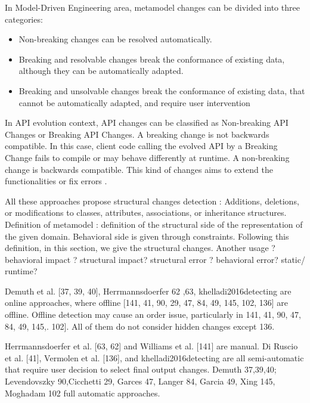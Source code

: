  In Model-Driven Engineering area, metamodel changes can be divided into three categories\cite{gruschko2007towards}:
 \begin{itemize}
 	
 \item	Non-breaking changes can be resolved automatically.
  \item Breaking and resolvable changes break the conformance of existing data, although they can be automatically adapted.
 \item Breaking and unsolvable changes break the conformance of existing data, that cannot be automatically adapted, and require user intervention
 \end{itemize}
 	In API evolution context, API changes can be classified as Non-breaking API Changes	or Breaking API Changes. A breaking change is not backwards compatible. In this case, client code calling the evolved API by a Breaking Change fails to compile or may behave differently at runtime. A non-breaking change is backwards compatible. This kind of changes aims to extend the functionalities or fix errors \cite{dig2006apis}.
 	
 	
 	


All these approaches propose structural changes detection : Additions, deletions, or modifications to classes, attributes, associations, or inheritance structures.
Definition of metamodel : definition of the structural side of the representation of the given domain. Behavioral side is given through constraints. Following this definition, in this section, we give the structural changes. Another usage ? behavioral impact ? structural impact? structural error ? behavioral error? static/ runtime? 


 

Demuth et al. [37, 39, 40], Herrmannsdoerfer 62 ,63, khelladi2016detecting are online approaches, where offline [141, 41, 90, 29, 47, 84, 49, 145,
102, 136] are offline.  Offline detection may cause an order issue, particularly in 141, 41, 90, 47, 84, 49, 145,. 102]. 
All of them do not consider hidden changes except 136.


Herrmannsdoerfer et al. [63, 62] and
Williams et al. [141] are manual. Di Ruscio et al. [41], Vermolen et al. [136], and khelladi2016detecting are all semi-automatic that require user decision to select final output changes.
Demuth 37,39,40; Levendovszky 90,Cicchetti 29, Garces 47, Langer 84, Garcia 49, Xing 145, Moghadam 102 full automatic approaches.

